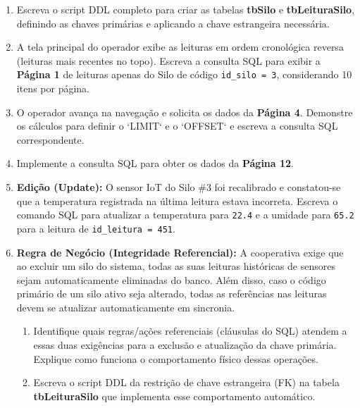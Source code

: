 \documentclass[12pt,a4paper]{article}
\newcommand{\resposta}[1]{}
\begin{document}
\vspace{0.4cm}

\begin{enumerate}[label=\textbf{\alph*)}]
    \item Escreva o script DDL completo para criar as tabelas \textbf{tbSilo} e \textbf{tbLeituraSilo}, definindo as chaves primárias e aplicando a chave estrangeira necessária.
    \resposta{5cm}
    
    \item A tela principal do operador exibe as leituras em ordem cronológica reversa (leituras mais recentes no topo). Escreva a consulta SQL para exibir a \textbf{Página 1} de leituras apenas do Silo de código \texttt{id\_silo = 3}, considerando 10 itens por página.
    \resposta{2.5cm}

    \item O operador avança na navegação e solicita os dados da \textbf{Página 4}. Demonstre os cálculos para definir o `LIMIT` e o `OFFSET` e escreva a consulta SQL correspondente.
    \resposta{3cm}

    \item Implemente a consulta SQL para obter os dados da \textbf{Página 12}.
    \resposta{2cm}

    \item \textbf{Edição (Update):} O sensor IoT do Silo \#3 foi recalibrado e constatou-se que a temperatura registrada na última leitura estava incorreta. Escreva o comando SQL para atualizar a temperatura para \texttt{22.4} e a umidade para \texttt{65.2} para a leitura de \texttt{id\_leitura = 451}.
    \resposta{2.5cm}

    \item \textbf{Regra de Negócio (Integridade Referencial):} A cooperativa exige que ao excluir um silo do sistema, todas as suas leituras históricas de sensores sejam automaticamente eliminadas do banco. Além disso, caso o código primário de um silo ativo seja alterado, todas as referências nas leituras devem se atualizar automaticamente em sincronia.
    \begin{enumerate}[label=\arabic*.]
        \item Identifique quais regras/ações referenciais (cláusulas do SQL) atendem a essas duas exigências para a exclusão e atualização da chave primária. Explique como funciona o comportamento físico dessas operações.
        \item Escreva o script DDL da restrição de chave estrangeira (FK) na tabela \textbf{tbLeituraSilo} que implementa esse comportamento automático.
    \end{enumerate}
    \resposta{4.5cm}
\end{enumerate}
\end{document}
